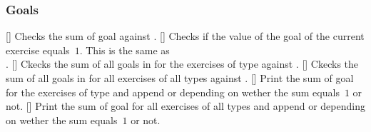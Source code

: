 \documentclass{xsim-manual}
\begin{document}
\subsubsection{Goals}
\begin{commands}
  []
    Checks the sum of goal  against .
  []
    Checks if the value of the goal  of the current exercise
    equals~$1$.  This is the same as \\
    .
  []
    Ckecks the sum of all goals in  for the exercises of
    type  against .
  []
    Ckecks the sum of all goals in  for all exercises of
    all types against .
  []
    Print the sum of goal  for the exercises of type 
    and append  or  depending on wether the sum
    equals~$1$ or not.
  []
    Print the sum of goal  for all exercises of all types
    and append  or  depending on wether the sum
    equals~$1$ or not.
\end{commands}
\end{document}
